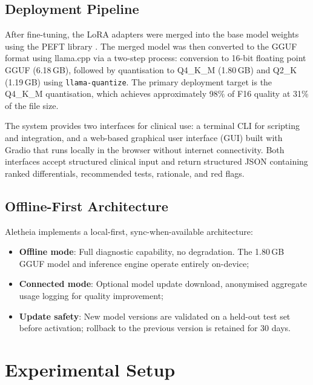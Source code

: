 \documentclass[journal]{IEEEtran}
\begin{document}
\subsection{Deployment Pipeline}

After fine-tuning, the LoRA adapters were merged into the base
model weights using the PEFT library \cite{peft2023}. The merged
model was then converted to the GGUF format using llama.cpp
\cite{gerganov2023llamacpp} via a two-step process: conversion to
16-bit floating point GGUF (6.18\,GB), followed by quantisation
to Q4\_K\_M (1.80\,GB) and Q2\_K (1.19\,GB) using
\texttt{llama-quantize}. The primary deployment target is the
Q4\_K\_M quantisation, which achieves approximately 98\% of F16
quality at 31\% of the file size.

The system provides two interfaces for clinical use: a terminal CLI for scripting and integration, and a web-based graphical user interface (GUI) built with Gradio \cite{aletheia_github} that runs locally in the browser without internet connectivity. Both interfaces accept structured clinical input and return structured JSON containing ranked differentials, recommended tests, rationale, and red flags.

\subsection{Offline-First Architecture}

Aletheia implements a local-first, sync-when-available architecture:
\begin{itemize}
  \item \textbf{Offline mode}: Full diagnostic capability, no
        degradation. The 1.80\,GB GGUF model and inference engine
        operate entirely on-device;
  \item \textbf{Connected mode}: Optional model update download,
        anonymised aggregate usage logging for quality improvement;
  \item \textbf{Update safety}: New model versions are validated on
        a held-out test set before activation; rollback to the
        previous version is retained for 30 days.
\end{itemize}

\section{Experimental Setup}
\label{sec:experiments}
\end{document}
